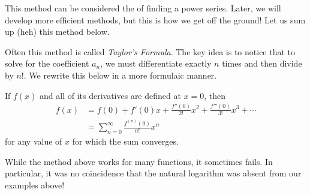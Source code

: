 This method can be considered the  of finding a power series.  Later, we will develop more efficient methods, but this is how we get off the ground!  Let us sum up (heh) this method below.

\begin{center}
\end{center}

Often this method is called \emph{Taylor's Formula}.  The key idea is to notice that to solve for the coefficient $a_n$, we must differentiate exactly $n$ times and then divide by $n!$.  We rewrite this below in a more formulaic manner. 

\begin{theorem}{}
If $f(x)$ and all of its derivatives are defined at $x=0$, then 
\begin{align*}
f(x)&=f(0)+f'(0)x+\frac{f''(0)}{2!}x^2+\frac{f'''(0)}{3!}x^3+\cdots \\
  &=\sum_{n=0}^\infty \frac{f^{(n)}(0)}{n!}x^n
\end{align*}
for any value of $x$ for which the sum converges.
\end{theorem}

While the method above works for many functions, it sometimes fails.  In particular, it was no coincidence that the natural logarithm was absent from our examples above!

